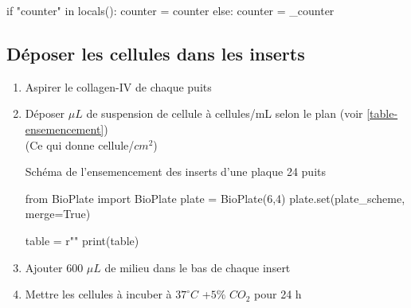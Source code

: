 \begin{pycode}

if "counter" in locals():
    counter = counter
else:
    counter = _counter


\end{pycode}


\subsection{Déposer les cellules dans les inserts}

\begin{enumerate}
\item Aspirer le collagen-IV de chaque puits
\item Déposer  $\mu L$ de suspension de cellule à  cellules/mL selon le plan (voir \ref{table-ensemencement}) \\ (Ce qui donne  cellule/$cm^2$)

\begin{table}[h]
\caption{Schéma de l'ensemencement des inserts d'une plaque 24 puits}
\begin{pycode}

from BioPlate import BioPlate
plate = BioPlate(6,4)
plate.set(plate_scheme, merge=True)

table = r""
print(table)
\end{pycode}
\label{table-ensemencement}
\end{table}
\item Ajouter 600 $\mu L$ de milieu dans le bas de chaque insert
\item Mettre les cellules à incuber à $37^\circ C$ +$5\%$ $CO_2$ pour 24 h

\end{enumerate}
